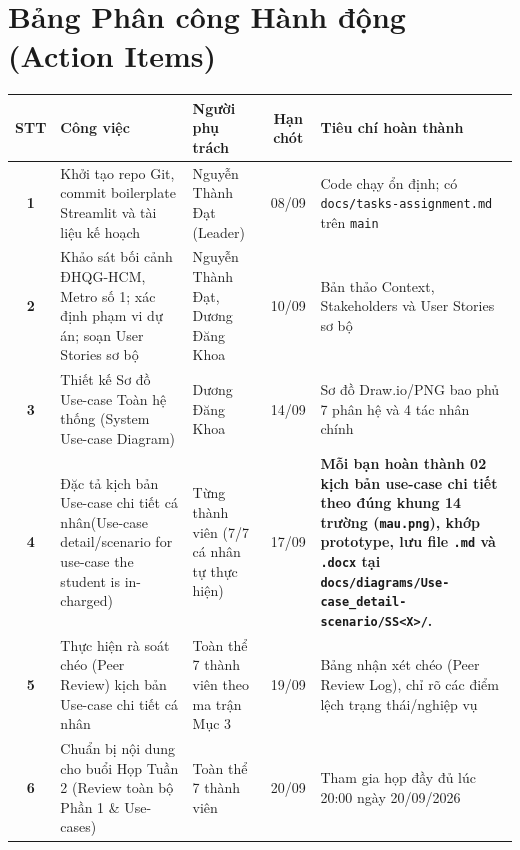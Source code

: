 \documentclass[11pt,a4paper]{article}
\begin{document}
\section{Bảng Phân công Hành động (Action Items)}

\renewcommand{\arraystretch}{1.3}
{\footnotesize
\begin{tabularx}{\textwidth}{|c|>{\raggedright\arraybackslash}X|>{\raggedright\arraybackslash}p{3.4cm}|c|>{\raggedright\arraybackslash}p{4.8cm}|}
  \hline
  \rowcolor{lightgray} \textbf{STT} & \textbf{Công việc} & \textbf{Người phụ trách} & \textbf{Hạn chót} & \textbf{Tiêu chí hoàn thành} \\
  \hline
  \textbf{1} &
  Khởi tạo repo Git, commit boilerplate Streamlit và tài liệu kế hoạch &
  Nguyễn Thành Đạt (Leader) &
  08/09 &
  Code chạy ổn định; có \texttt{docs/tasks-assignment.md} trên \texttt{main} \\
  \hline
  \textbf{2} &
  Khảo sát bối cảnh ĐHQG-HCM, Metro số 1; xác định phạm vi dự án; soạn User Stories sơ bộ &
  Nguyễn Thành Đạt, Dương Đăng Khoa &
  10/09 &
  Bản thảo Context, Stakeholders và User Stories sơ bộ \\
  \hline
  \textbf{3} &
  Thiết kế Sơ đồ Use-case Toàn hệ thống (System Use-case Diagram) &
  Dương Đăng Khoa &
  14/09 &
  Sơ đồ Draw.io/PNG bao phủ 7 phân hệ và 4 tác nhân chính \\
  \hline
  \textbf{4} &
  Đặc tả kịch bản Use-case chi tiết cá nhân(Use-case detail/scenario for use-case the student is in-charged) &
  Từng thành viên (7/7 cá nhân tự thực hiện) &
  17/09 &
  \textbf{Mỗi bạn hoàn thành 02 kịch bản use-case chi tiết theo đúng khung 14 trường (\texttt{mau.png}), khớp prototype, lưu file \texttt{.md} và \texttt{.docx} tại \texttt{docs/diagrams/Use-case\_\allowbreak detail-scenario/SS<X>/}.} \\
  \hline
  \textbf{5} &
  Thực hiện rà soát chéo (Peer Review) kịch bản Use-case chi tiết cá nhân &
  Toàn thể 7 thành viên theo ma trận Mục 3 &
  19/09 &
  Bảng nhận xét chéo (Peer Review Log), chỉ rõ các điểm lệch trạng thái/nghiệp vụ \\
  \hline
  \textbf{6} &
  Chuẩn bị nội dung cho buổi Họp Tuần 2 (Review toàn bộ Phần 1 \& Use-cases) &
  Toàn thể 7 thành viên &
  20/09 &
  Tham gia họp đầy đủ lúc 20:00 ngày 20/09/2026 \\
  \hline
\end{tabularx}
}
\end{document}
